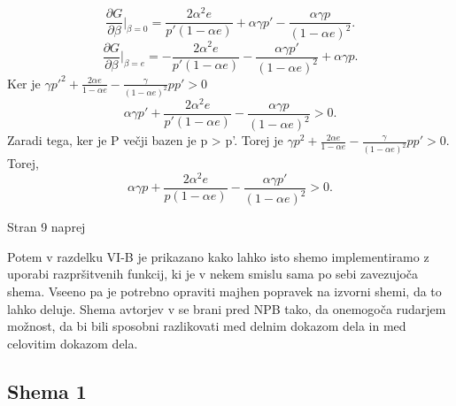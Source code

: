 \documentclass[12pt]{article}
\begin{document}
\begin{equation}
\frac{\partial G}{\partial \beta} |_{\beta=0} = \frac{2\alpha^2 e}{p' (1 - \alpha e)} + \alpha\gamma p' - \frac{\alpha\gamma p }{(1 - \alpha e)^2}.
\end{equation}
\begin{equation}
\frac{\partial G}{\partial \beta} |_{\beta=e} = -\frac{2\alpha^2 e}{p' (1 - \alpha e)}- \frac{\alpha\gamma p' }{(1 - \alpha e)^2} + \alpha\gamma p.
\end{equation}
Ker je $\gamma p'^2 + \frac{2\alpha e}{1 - \alpha e} - \frac{\gamma}{(1 - \alpha e) ^ 2} p p' > 0$
\begin{equation}
\alpha\gamma p' + \frac{2\alpha^2 e}{p'(1 - \alpha e)} - \frac{\alpha\gamma p}{(1 - \alpha e)^2} > 0.
\end{equation}
Zaradi tega, ker je P večji bazen je p > p'. Torej je $\gamma p^2 + \frac{2\alpha e}{1 - \alpha e} - \frac{\gamma}{(1 - \alpha e)^2} p p' > 0$. Torej,
\begin{equation}
\alpha\gamma p + \frac{2\alpha^2 e}{p(1 - \alpha e)} - \frac{\alpha\gamma p'}{(1- \alpha e)^2} > 0.
\end{equation}

\newpage 
Stran 9 naprej

Potem v razdelku VI-B je prikazano kako lahko isto shemo implementiramo z uporabi razpršitvenih funkcij, ki je v nekem smislu sama po sebi zavezujoča shema. Vseeno pa je potrebno opraviti majhen popravek na izvorni shemi, da to lahko deluje. Shema avtorjev v \cite{originalarticle} se brani pred NPB tako, da onemogoča rudarjem možnost, da bi bili sposobni razlikovati med delnim dokazom dela in med celovitim dokazom dela.

\subsection{Shema 1}
\end{document}
